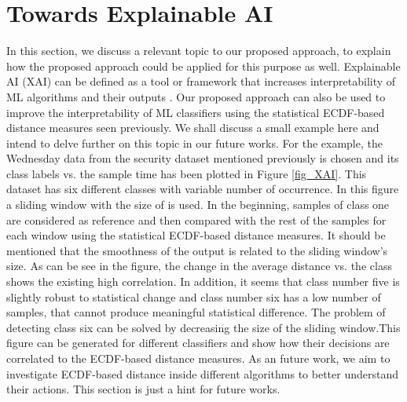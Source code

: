 \documentclass{article}
\begin{document}
\section{Towards Explainable AI} \label{section-xai}
In this section, we discuss a relevant topic to our proposed approach, to explain how the proposed approach could be applied for this purpose as well. Explainable AI (XAI) can be defined as a tool or framework that increases interpretability of ML algorithms and their outputs \cite{cutillo2020machine}. Our proposed approach can also be used to improve the interpretability of ML classifiers using the statistical ECDF-based distance measures seen previously. We shall discuss a small example here and intend to delve further on this topic in our future works. For the example, the Wednesday data from the security dataset mentioned previously is chosen and its class labels vs. the sample time has been plotted in Figure \ref{fig_XAI}. This dataset has six different classes with variable number of occurrence. In this figure a sliding window with the size of  is used. In the beginning,  samples of class one are considered as reference and then compared with the rest of the samples for each window using the statistical ECDF-based distance measures. It should be mentioned that the smoothness of the output is related to the sliding window's size. As can be see in the figure, the change in the average distance vs. the class shows the existing high correlation. In addition, it seems that class number five is slightly robust to statistical change and class number six has a low number of samples, that cannot produce meaningful statistical difference. The problem of detecting class six can be solved by decreasing the size of the sliding window.This figure can be generated for different classifiers and show how their decisions are correlated to the ECDF-based distance measures. As an future work, we aim to investigate ECDF-based distance inside different algorithms to better understand their actions. This section is just a hint for future works. 

\begin{comment}
\todo[inline]{I cannot understand this section completely. As an XAI technique, the approach needs to improve the understandability of the ML system. I am not certain, if this can be derived from the Fig. 9. It rather seems to me that high correlations stand for a high quality of the classifier, although we are not able to interpret the ML classifier, i.e., explain the reason for the improved quality.}
\end{comment}
\end{document}
